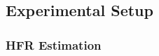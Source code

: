 \documentclass{article}
\newcommand{\rjtcomment}[1]{{\color{purple}[RJT: #1]}}
\begin{document}





\subsection{Experimental Setup}\label{sec:setup}
\subsubsection{HFR Estimation}
\end{document}
